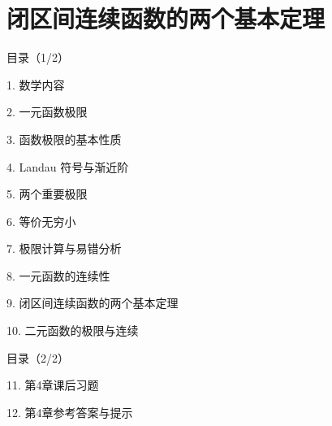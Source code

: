 \documentclass[aspectratio=169,10pt,fontset=fandol]{ctexbeamer}
\begin{document}
\section{闭区间连续函数的两个基本定理}
\begin{frame}[t,fragile]{目录（1/2）}
\normalsize
{\color{black}\normalsize 1. 数学内容\par}\vspace{0.3em}
{\color{black}\normalsize 2. 一元函数极限\par}\vspace{0.3em}
{\color{black}\normalsize 3. 函数极限的基本性质\par}\vspace{0.3em}
{\color{black}\normalsize 4. Landau 符号与渐近阶\par}\vspace{0.3em}
{\color{black}\normalsize 5. 两个重要极限\par}\vspace{0.3em}
{\color{black}\normalsize 6. 等价无穷小\par}\vspace{0.3em}
{\color{black}\normalsize 7. 极限计算与易错分析\par}\vspace{0.3em}
{\color{black}\normalsize 8. 一元函数的连续性\par}\vspace{0.3em}
{\color{blue}\normalsize 9. 闭区间连续函数的两个基本定理\par}\vspace{0.3em}
{\color{gray!40}\normalsize 10. 二元函数的极限与连续\par}\vspace{0.3em}
\end{frame}
\begin{frame}[t,fragile]{目录（2/2）}
\normalsize
{\color{gray!40}\normalsize 11. 第4章课后习题\par}\vspace{0.3em}
{\color{gray!40}\normalsize 12. 第4章参考答案与提示\par}\vspace{0.3em}
\end{frame}
\end{document}
